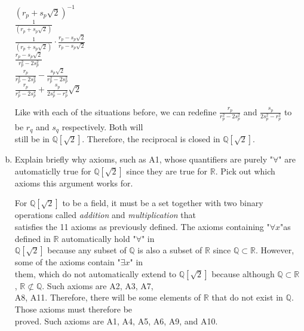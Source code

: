 \documentclass{article}
\begin{document}
\begin{flushleft}
\begin{enumerate}[a)]
\begin{flushleft}
\begin{center}
$(r_p + s_p \sqrt{2})^{-1}$ \\
\vspace{0.25cm}
$\frac{1}{(r_p + s_p \sqrt{2})}$ \\
\vspace{0.25cm}
$\frac{1}{(r_p + s_p \sqrt{2})} \cdot \frac{r_p-s_p\sqrt{2}}{r_p-s_p\sqrt{2}}$ \\
\vspace{0.25cm}
$\frac{r_p-s_p\sqrt{2}}{r_p^2 - 2s_p^2}$ \\
\vspace{0.25cm}
$\frac{r_p}{r_p^2 - 2s_p^2} - \frac{s_p\sqrt{2}}{r_p^2 - 2s_p^2}$ \\
\vspace{0.25cm}
$\frac{r_p}{r_p^2 - 2s_p^2} + \frac{s_p}{2s_p^2 - r_p^2}\sqrt{2}$ \\
\end{center}
\qquad Like with each of the situations before, we can redefine $\frac{r_p}{r_p^2 - 2s_p^2}$ and $\frac{s_p}{2s_p^2 - r_p^2}$ to be $r_q$ and $s_q$ respectively. Both will \\ 
\qquad still be in $\mathbb{Q}[\sqrt{2}]$. Therefore, the reciprocal is closed in $\mathbb{Q}[\sqrt{2}]$. \\
\end{flushleft}

\item Explain briefly why axioms, such as A1, whose quantifiers are purely "$\forall$" are automaticlly true for  $\mathbb{Q}[\sqrt{2}]$ since they are true for $\mathbb{R}$. Pick out which axioms this argument works for.

\vspace{.5cm}

\qquad For $\mathbb{Q}[\sqrt{2}]$ to be a field, it must be a set together with two binary operations called \emph{addition} and \emph{multiplication} that \\
\qquad satisfies the 11 axioms as previously defined. The axioms containing "$\forall x$"as defined in $\mathbb{R}$ automatically hold "$\forall$" in \\ 
\qquad $\mathbb{Q}[\sqrt{2}]$ because any subset of $\mathbb{Q}$ is also a subset of $\mathbb{R}$ since $\mathbb{Q} \subset \mathbb{R}$. However, some of the axioms contain "$\exists x$" in \\
\qquad them, which do not automatically extend to $\mathbb{Q}[\sqrt{2}]$ because although $\mathbb{Q} \subset \mathbb{R}$, $\mathbb{R} \not \subset \mathbb{Q}$. Such axioms are A2, A3, A7, \\
\qquad A8, A11. Therefore, there will be some elements of $\mathbb{R}$ that do not exist in $\mathbb{Q}$. Those axioms must therefore be \\ \qquad proved. Such axioms are A1, A4, A5, A6, A9, and A10. 


\end{enumerate}
\end{flushleft}
\end{document}
